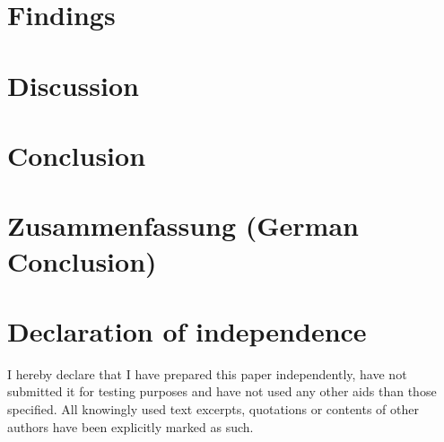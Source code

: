 \documentclass[12pt,a4paper,titlepage,oneside,abstract=true,toc=listof,toc=bibliography]{scrreprt}
\begin{document}
{	
	
\chapter{Findings}

\chapter{Discussion}

\chapter{Conclusion}

\chapter{Zusammenfassung (German Conclusion)}

 
\cleardoublepage			

\chapter*{Declaration of independence}
I hereby declare that I have prepared this paper independently, have not submitted it for testing purposes and have not used any other aids than those specified. All knowingly used text excerpts, quotations or contents of other authors have been explicitly marked as such. \\[2ex]

}
\end{document}
